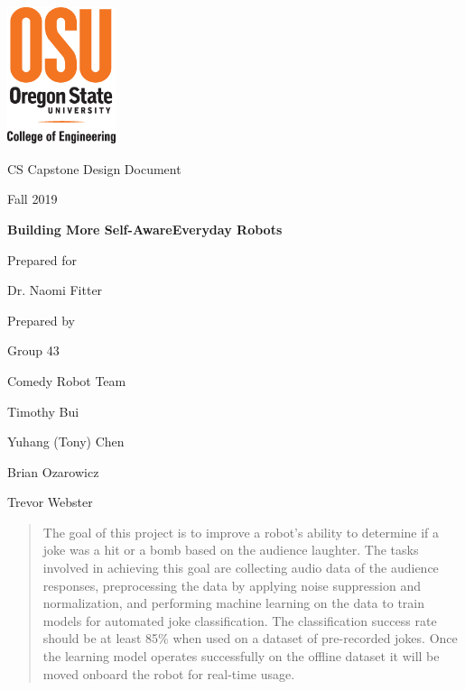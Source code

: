 \documentclass[onecolumn, draftclsnofoot,10pt, compsoc]{IEEEtran}
\def \CapstoneTeamName{		    Comedy Robot Team}
\def \CapstoneTeamNumber{		43}
\def \GroupMemberOne{			Timothy Bui}
\def \GroupMemberTwo{			Yuhang (Tony) Chen}
\def \GroupMemberThree{			Brian Ozarowicz}
\def \GroupMemberFour{			Trevor Webster}
\def \CapstoneProjectName{		Building More Self-Aware\linebreak Everyday Robots}
\def \CapstoneSponsorCompany{	SHARE Lab}
\def \CapstoneSponsorPerson{	Dr. Naomi Fitter}
\def \DocType{	%
				Design Document
				}
\newcommand{\NameSigPair}[1]{\par
\makebox[2.75in][r]{#1} \hfil 	\makebox[3.25in]{\makebox[2.25in]{\hrulefill} \hfill		\makebox[.75in]{\hrulefill}}
\par\vspace{-12pt} \textit{\tiny\noindent
\makebox[2.75in]{} \hfil		\makebox[3.25in]{\makebox[2.25in][r]{Signature} \hfill	\makebox[.75in][r]{Date}}}}
\renewcommand{\NameSigPair}[1]{#1}
\begin{document}
\begin{titlepage}
    \begin{singlespace}
    	\includegraphics[height=4cm]{coe_v_spot1}
        \hfill 
        \par\vspace{.2in}
        \centering
        \scshape{
            \huge CS Capstone \DocType \par
            {\large Fall 2019}\par
            \vspace{.5in}
            \textbf{\Huge\CapstoneProjectName}\par
            \vfill
            {\large Prepared for}\par
            {\Large\NameSigPair{\CapstoneSponsorPerson}\par}
            {\large Prepared by }\par
            Group\CapstoneTeamNumber\par
            \CapstoneTeamName\par 
            \vspace{5pt}
            {\Large
                \NameSigPair{\GroupMemberOne}\par
                \NameSigPair{\GroupMemberTwo}\par
                \NameSigPair{\GroupMemberThree}\par
                \NameSigPair{\GroupMemberFour}\par
            }
            \vspace{20pt}
        }
        \begin{abstract}
        	\noindent The goal of this project is to improve a robot's ability to determine if a joke was a hit or a bomb based on the audience laughter. The tasks involved in achieving this goal are collecting audio data of the audience responses, preprocessing the data by applying noise suppression and normalization, and performing machine learning on the data to train models for automated joke classification. The classification success rate should be at least 85\% when used on a dataset of pre-recorded jokes. Once the learning model operates successfully on the offline dataset it will be moved onboard the robot for real-time usage.
        \end{abstract}
    \end{singlespace}
\end{titlepage}
\end{document}
